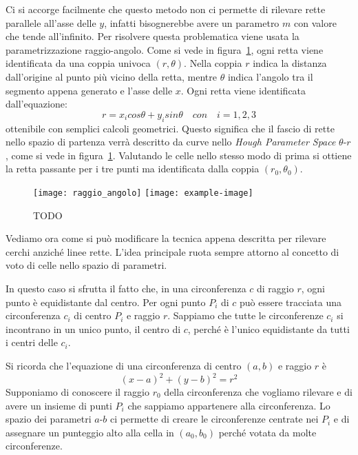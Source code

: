 Ci si accorge facilmente che questo metodo non ci permette di rilevare rette parallele all'asse delle $y$, infatti bisognerebbe avere un parametro $m$ con valore che tende all'infinito.
Per risolvere questa problematica viene usata la parametrizzazione raggio-angolo.
Come si vede in figura~\ref{fig:hough_parametr_raggio-angolo}, ogni retta viene identificata da una coppia univoca $(r,\theta)$.
Nella coppia $r$ indica la distanza dall'origine al punto più vicino della retta, mentre $\theta$ indica l'angolo tra il segmento appena generato e l'asse delle $x$.
Ogni retta viene identificata dall'equazione:
\begin{equation} \label{eq:raggio_angolo_parametr}
  r = x_i cos \theta + y_i sin \theta \quad con \quad i=1,2,3
\end{equation}
ottenibile con semplici calcoli geometrici.
Questo significa che il fascio di rette nello spazio di partenza verrà descritto da curve nello \textit{Hough Parameter Space} $\theta$-$r$, come si vede in figura~\ref{fig:hough_parametr_raggio-angolo}.
Valutando le celle nello stesso modo di prima si ottiene la retta passante per i tre punti ma identificata dalla coppia $(r_0,\theta_0)$.

\begin{figure}[ht] %
  \begin{center}
    \texttt{[image: raggio\_angolo]}
    \texttt{[image: example-image]}
    \caption{TODO }
    \label{fig:hough_parametr_raggio-angolo}
  \end{center}
\end{figure}


Vediamo ora come si può modificare la tecnica appena descritta per rilevare cerchi anziché linee rette.
L'idea principale ruota sempre attorno al concetto di voto di celle nello spazio di parametri.

In questo caso si sfrutta il fatto che, in una circonferenza $c$ di raggio $r$, ogni punto è equidistante dal centro.
Per ogni punto $P_i$ di $c$ può essere tracciata una circonferenza $c_i$ di centro $P_i$ e raggio $r$.
Sappiamo che tutte le circonferenze $c_i$ si incontrano in un unico punto, il centro di $c$, perché è l'unico equidistante da tutti i centri delle $c_i$.

Si ricorda che l'equazione di una circonferenza di centro $(a,b)$ e raggio $r$ è
\begin{equation} \label{eq:circonferenza}
  (x - a)^2 + (y - b)^2 = r^2
\end{equation}
Supponiamo di conoscere il raggio $r_0$ della circonferenza che vogliamo rilevare e di avere un insieme di punti $P_i$ che sappiamo appartenere alla circonferenza.
Lo spazio dei parametri $a$-$b$ ci permette di creare le circonferenze centrate nei $P_i$ e di assegnare un punteggio alto alla cella in $(a_0,b_0)$ perché votata da molte circonferenze.

